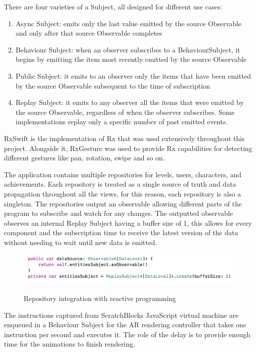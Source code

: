 \documentclass[12 pct]{report}
\begin{document}
There are four varieties of a Subject, all designed for different use cases:
\begin{enumerate}
\item Async Subject: emits only the last value emitted by the source Observable and only after that source Observable completes
\item Behaviour Subject: when an observer subscribes to a BehaviourSubject, it begins by emitting the item most recently emitted by the source Observable
\item Public Subject: it emits to an observer only the items that have been emitted by the source Observable subsequent to the time of subscription
\item Replay Subject: it emits to any observer all the items that were emitted by the source Observable, regardless of when the observer subscribes. Some implementations replay only a specific number of past emitted events.
\end{enumerate}

RxSwift is the implementation of Rx that was used extensively throughout this project. Alongside it, RxGesture was used to provide Rx capabilities for detecting different gestures like pan, rotation, swipe and so on.

The application contains multiple repositories for levels, users, characters, and achievements. Each repository is treated as a single source of truth and data propagation throughout all the views, for this reason, each repository is also a singleton. The repositories output an observable allowing different parts of the program to subscribe and watch for any changes. The outputted observable observes an internal Replay Subject having a buffer size of 1, this allows for every component and the subscription time to receive the latest version of the data without needing to wait until new data is emitted.

\begin{figure}[H]
\includegraphics[width=1.0\textwidth]{reactive-repository}
\centering
\label{fig:reactive-repository}
\caption{Repository integration with reactive programming }
\end{figure}

The instructions captured from ScratchBlocks JavaScript virtual machine are enqueued in a Behaviour Subject for the AR rendering controller that takes one instruction per second and executes it. The role of the delay is to provide enough time for the animations to finish rendering. 
\end{document}
